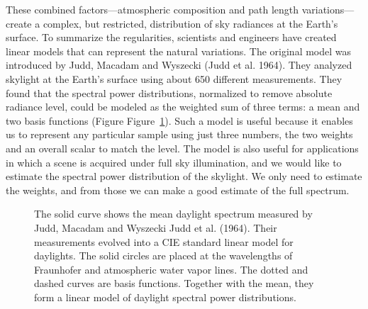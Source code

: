 \documentclass[
  letterpaper,
]{book}
\begin{document}
These combined factors---atmospheric composition and path length
variations---create a complex, but restricted, distribution of sky
radiances at the Earth's surface. To summarize the regularities,
scientists and engineers have created linear models that can represent
the natural variations. The original model was introduced by Judd,
Macadam and Wyszecki (Judd et al. 1964). They analyzed skylight at the
Earth's surface using about 650 different measurements. They found that
the spectral power distributions, normalized to remove absolute radiance
level, could be modeled as the weighted sum of three terms: a mean and
two basis functions (Figure Figure~\ref{fig-ciedaylight}). Such a model
is useful because it enables us to represent any particular sample using
just three numbers, the two weights and an overall scalar to match the
level. The model is also useful for applications in which a scene is
acquired under full sky illumination, and we would like to estimate the
spectral power distribution of the skylight. We only need to estimate
the weights, and from those we can make a good estimate of the full
spectrum.

\begin{figure}


\caption{\label{fig-ciedaylight}The solid curve shows the mean daylight
spectrum measured by Judd, Macadam and Wyszecki Judd et al. (1964).
Their measurements evolved into a CIE standard linear model for
daylights. The solid circles are placed at the wavelengths of Fraunhofer
and atmospheric water vapor lines. The dotted and dashed curves are
basis functions. Together with the mean, they form a linear model of
daylight spectral power distributions.}

\end{figure}%
\end{document}
